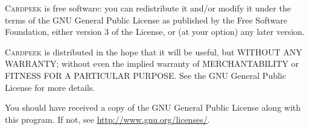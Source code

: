 \documentclass[11pt]{report}
\newcommand{\Cardpeek}{\textsc{Cardpeek}}
\begin{document}
\Cardpeek{} is free software: you can redistribute it and/or modify
it under the terms of the GNU General Public License as published by
the Free Software Foundation, either version 3 of the License, or
(at your option) any later version.

\Cardpeek{} is distributed in the hope that it will be useful,
but WITHOUT ANY WARRANTY; without even the implied warranty of
MERCHANTABILITY or FITNESS FOR A PARTICULAR PURPOSE.  See the
GNU General Public License for more details.

You should have received a copy of the GNU General Public License
along with this program.  If not, see \url{http://www.gnu.org/licenses/}.
\end{document}
